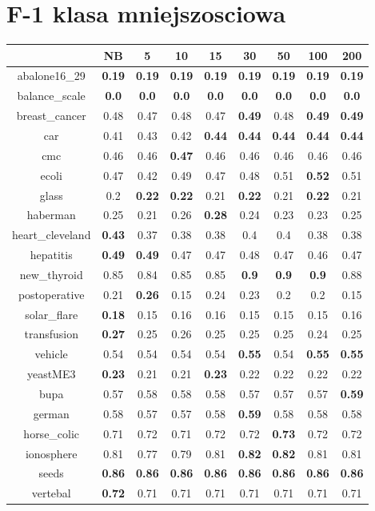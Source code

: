 \documentclass{article}%
\begin{document}
%
\section*{F{-}1 klasa mniejszosciowa}%
\begin{tabular}{c|cccccccc}%
\hline%
&NB&5&10&15&30&50&100&200\\%
\hline%
abalone16\_29&\textbf{0.19}&\textbf{0.19}&\textbf{0.19}&\textbf{0.19}&\textbf{0.19}&\textbf{0.19}&\textbf{0.19}&\textbf{0.19}\\%
\hline%
balance\_scale&\textbf{0.0}&\textbf{0.0}&\textbf{0.0}&\textbf{0.0}&\textbf{0.0}&\textbf{0.0}&\textbf{0.0}&\textbf{0.0}\\%
\hline%
breast\_cancer&0.48&0.47&0.48&0.47&\textbf{0.49}&0.48&\textbf{0.49}&\textbf{0.49}\\%
\hline%
car&0.41&0.43&0.42&\textbf{0.44}&\textbf{0.44}&\textbf{0.44}&\textbf{0.44}&\textbf{0.44}\\%
\hline%
cmc&0.46&0.46&\textbf{0.47}&0.46&0.46&0.46&0.46&0.46\\%
\hline%
ecoli&0.47&0.42&0.49&0.47&0.48&0.51&\textbf{0.52}&0.51\\%
\hline%
glass&0.2&\textbf{0.22}&\textbf{0.22}&0.21&\textbf{0.22}&0.21&\textbf{0.22}&0.21\\%
\hline%
haberman&0.25&0.21&0.26&\textbf{0.28}&0.24&0.23&0.23&0.25\\%
\hline%
heart\_cleveland&\textbf{0.43}&0.37&0.38&0.38&0.4&0.4&0.38&0.38\\%
\hline%
hepatitis&\textbf{0.49}&\textbf{0.49}&0.47&0.47&0.48&0.47&0.46&0.47\\%
\hline%
new\_thyroid&0.85&0.84&0.85&0.85&\textbf{0.9}&\textbf{0.9}&\textbf{0.9}&0.88\\%
\hline%
postoperative&0.21&\textbf{0.26}&0.15&0.24&0.23&0.2&0.2&0.15\\%
\hline%
solar\_flare&\textbf{0.18}&0.15&0.16&0.16&0.15&0.15&0.15&0.16\\%
\hline%
transfusion&\textbf{0.27}&0.25&0.26&0.25&0.25&0.25&0.24&0.25\\%
\hline%
vehicle&0.54&0.54&0.54&0.54&\textbf{0.55}&0.54&\textbf{0.55}&\textbf{0.55}\\%
\hline%
yeastME3&\textbf{0.23}&0.21&0.21&\textbf{0.23}&0.22&0.22&0.22&0.22\\%
\hline%
bupa&0.57&0.58&0.58&0.58&0.57&0.57&0.57&\textbf{0.59}\\%
\hline%
german&0.58&0.57&0.57&0.58&\textbf{0.59}&0.58&0.58&0.58\\%
\hline%
horse\_colic&0.71&0.72&0.71&0.72&0.72&\textbf{0.73}&0.72&0.72\\%
\hline%
ionosphere&0.81&0.77&0.79&0.81&\textbf{0.82}&\textbf{0.82}&0.81&0.81\\%
\hline%
seeds&\textbf{0.86}&\textbf{0.86}&\textbf{0.86}&\textbf{0.86}&\textbf{0.86}&\textbf{0.86}&\textbf{0.86}&\textbf{0.86}\\%
\hline%
vertebal&\textbf{0.72}&0.71&0.71&0.71&0.71&0.71&0.71&0.71\\%
\hline%
\end{tabular}
\end{document}
